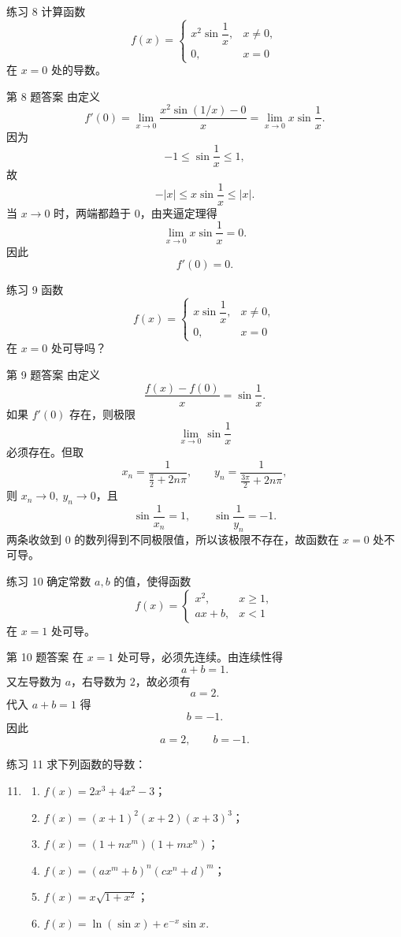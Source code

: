 ﻿\documentclass[aspectratio=169,11pt]{ctexbeamer}
\begin{document}
\begin{frame}{练习 8}
\footnotesize
计算函数
\[
f(x)=\begin{cases}
x^2\sin\dfrac1x,&x\neq0,\\
0,&x=0
\end{cases}
\]
在 $x=0$ 处的导数。
\end{frame}

\begin{frame}{第 8 题答案}
\footnotesize
由定义
\[
f'(0)=\lim_{x\to0}\frac{x^2\sin(1/x)-0}{x}=\lim_{x\to0}x\sin\frac1x.
\]
因为
\[
-1\le\sin\frac1x\le1,
\]
故
\[
-|x|\le x\sin\frac1x\le |x|.
\]
当 $x\to0$ 时，两端都趋于 $0$，由夹逼定理得
\[
\lim_{x\to0}x\sin\frac1x=0.
\]
因此
\[
f'(0)=0.
\]
\end{frame}

\begin{frame}{练习 9}
\footnotesize
函数
\[
f(x)=\begin{cases}
x\sin\dfrac1x,&x\neq0,\\
0,&x=0
\end{cases}
\]
在 $x=0$ 处可导吗？
\end{frame}

\begin{frame}{第 9 题答案}
\footnotesize
由定义
\[
\frac{f(x)-f(0)}{x}=\sin\frac1x.
\]
如果 $f'(0)$ 存在，则极限
\[
\lim_{x\to0}\sin\frac1x
\]
必须存在。但取
\[
x_n=\frac{1}{\frac\pi2+2n\pi},\qquad y_n=\frac{1}{\frac{3\pi}{2}+2n\pi},
\]
则 $x_n\to0,\ y_n\to0$，且
\[
\sin\frac1{x_n}=1,\qquad \sin\frac1{y_n}=-1.
\]
两条收敛到 $0$ 的数列得到不同极限值，所以该极限不存在，故函数在 $x=0$ 处不可导。
\end{frame}

\begin{frame}{练习 10}
\footnotesize
确定常数 $a,b$ 的值，使得函数
\[
f(x)=\begin{cases}
x^2,&x\ge1,\\
ax+b,&x<1
\end{cases}
\]
在 $x=1$ 处可导。
\end{frame}

\begin{frame}{第 10 题答案}
\footnotesize
在 $x=1$ 处可导，必须先连续。由连续性得
\[
a+b=1.
\]
又左导数为 $a$，右导数为 $2$，故必须有
\[
a=2.
\]
代入 $a+b=1$ 得
\[
b=-1.
\]
因此
\[
a=2,\qquad b=-1.
\]
\end{frame}

\begin{frame}{练习 11}
\scriptsize
求下列函数的导数：
\begin{enumerate}
\setcounter{enumi}{10}
\item
\begin{enumerate}
\item $f(x)=2x^3+4x^2-3$；
\item $f(x)=(x+1)^2(x+2)(x+3)^3$；
\item $f(x)=(1+nx^m)(1+mx^n)$；
\item $f(x)=(ax^m+b)^n(cx^n+d)^m$；
\item $f(x)=x\sqrt{1+x^2}$；
\item $f(x)=\ln(\sin x)+e^{-x}\sin x$.
\end{enumerate}
\end{enumerate}
\end{frame}
\end{document}
